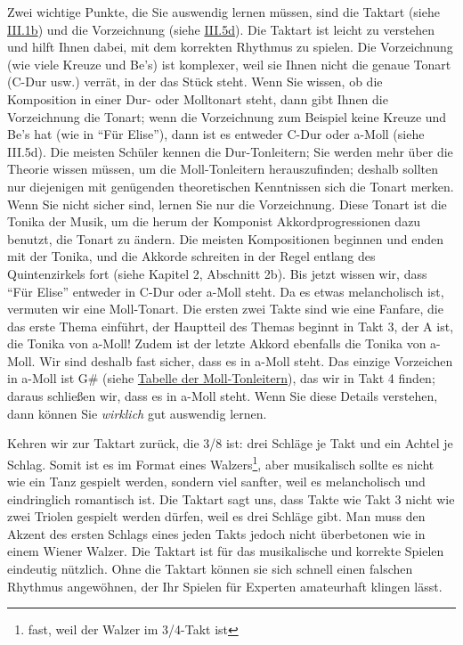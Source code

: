 Zwei wichtige Punkte, die Sie auswendig lernen müssen, sind die Taktart (siehe \hyperlink{c1iii1b}{III.1b}) und die Vorzeichnung (siehe \hyperlink{c1iii5d}{III.5d}).
Die Taktart ist leicht zu verstehen und hilft Ihnen dabei, mit dem korrekten Rhythmus zu spielen.
Die Vorzeichnung (wie viele Kreuze und Be's) ist komplexer, weil sie Ihnen nicht die genaue Tonart (C-Dur usw.) verrät, in der das Stück steht.
Wenn Sie wissen, ob die Komposition in einer Dur- oder Molltonart steht, dann gibt Ihnen die Vorzeichnung die Tonart; wenn die Vorzeichnung zum Beispiel keine Kreuze und Be's hat (wie in \enquote{Für Elise}), dann  ist es entweder C-Dur oder a-Moll (siehe III.5d).
Die meisten Schüler kennen die Dur-Tonleitern; Sie werden mehr über die Theorie wissen müssen, um die Moll-Tonleitern herauszufinden;
deshalb sollten nur diejenigen mit genügenden theoretischen Kenntnissen sich die Tonart merken.
Wenn Sie nicht sicher sind, lernen Sie nur die Vorzeichnung.
Diese Tonart ist die Tonika der Musik, um die herum der Komponist Akkordprogressionen dazu benutzt, die Tonart zu ändern.
Die meisten Kompositionen beginnen und enden mit der Tonika, und die Akkorde schreiten in der Regel entlang des Quintenzirkels fort (siehe Kapitel 2, Abschnitt 2b). Bis jetzt wissen wir, dass \enquote{Für Elise} entweder in C-Dur oder a-Moll steht.
Da es etwas melancholisch ist, vermuten wir eine Moll-Tonart.
Die ersten zwei Takte sind wie eine Fanfare, die das erste Thema einführt, der Hauptteil des Themas beginnt in Takt 3, der A ist, die Tonika von a-Moll!
Zudem ist der letzte Akkord ebenfalls die Tonika von a-Moll.
Wir sind deshalb fast sicher, dass es in a-Moll steht.
Das einzige Vorzeichen in a-Moll ist G\# (siehe \hyperlink{tablemoll}{Tabelle der Moll-Tonleitern}), das wir in Takt 4 finden; daraus schließen wir, dass es in a-Moll steht.
Wenn Sie diese Details verstehen, dann können Sie \textit{wirklich} gut auswendig lernen.

Kehren wir zur Taktart zurück, die 3/8 ist: drei Schläge je Takt und ein Achtel je Schlag.
Somit ist es im Format eines Walzers\footnote{fast, weil der Walzer im 3/4-Takt ist}, aber musikalisch sollte es nicht wie ein Tanz gespielt werden, sondern viel sanfter, weil es melancholisch und eindringlich romantisch ist.
Die Taktart sagt uns, dass Takte wie Takt 3 nicht wie zwei Triolen gespielt werden dürfen, weil es drei Schläge gibt.
Man muss den Akzent des ersten Schlags eines jeden Takts jedoch nicht überbetonen wie in einem Wiener Walzer.
Die Taktart ist für das musikalische und korrekte Spielen eindeutig  nützlich.
Ohne die Taktart können sie sich schnell einen falschen Rhythmus angewöhnen, der Ihr Spielen für Experten amateurhaft klingen lässt.

